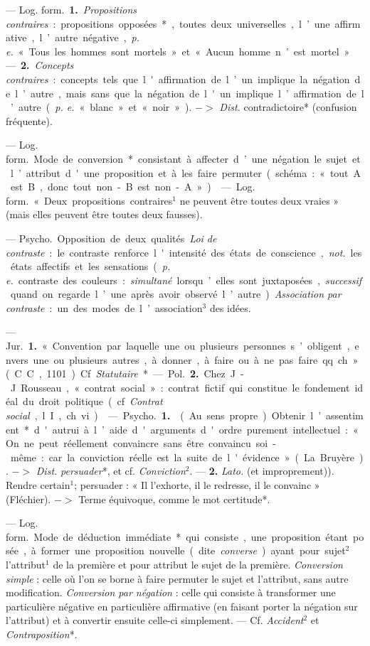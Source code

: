\begin{itemize}[leftmargin=1cm, label=, itemsep=11pt]
 — \si{Log. form.} {\bf 1.} {\it Propositions contraires} : propositions opposées*, toutes deux universelles, l’une
affirmative, l’autre négative, {\it p. e.}
« Tous les hommes sont mortels » et
« Aucun homme n’est mortel » —
 {\bf 2.} {\it Concepts contraires} : concepts tels
que l'affirmation de l’un implique
la négation de l’autre, mais sans que
la négation de l'un implique l’affirmation de l’autre ({\it p. e.} « blanc » et
« noir »). $->$ {\it Dist.} contradictoire*
(confusion fréquente).

 — \si{Log. form.} Mode
de conversion* consistant à affecter
d’une négation le sujet et l’attribut
d'une proposition et à les faire permuter (schéma : « tout A est B,
donc tout non-B est non-A »).

 — \si{Log. form.} « Deux propositions contraires$^1$
ne peuvent être toutes deux vraies »
(mais elles peuvent être toutes deux
fausses).

 — \si{Psycho.} Opposition de
deux qualités. {\it Loi de contraste} : le
contraste renforce l'intensité des
états de conscience, {\it not.} les états
affectifs et les sensations ({\it p. e.} contraste des couleurs : {\it simultané} lorsqu’elles sont juxtaposées, {\it successif}
quand on regarde l’une après avoir
observé l’autre). {\it Association par contraste} :
un des modes de l’association$^3$ des idées.

 — \si{Jur.} {\bf 1.} « Convention par
laquelle une ou plusieurs personnes
s’obligent, envers une ou plusieurs
autres, à donner, à faire ou à ne
pas faire qq. ch. » (C. C., 1101). Cf. {\it Statutaire}*.

— \si{Pol.} {\bf 2.} Chez J.-J. Rousseau,
«contrat social »: contrat fictif qui
constitue le fondement idéal du
droit politique (cf. {\it Contrat social},
l. I, ch. vi).

 — \si{Psycho.} {\bf 1.}  (Au sens
propre). Obtenir l’assentiment*
d'autrui à l’aide d'arguments d'ordre
purement intellectuel : « On ne peut
réellement convaincre sans être
convaincu soi-même: car la conviction réelle est la suite de l'évidence »
(La Bruyère). $->$ {\it Dist.} {\it persuader}*,
et cf. {\it Conviction}$^2$. — {\bf 2.} {\it Lato.} (et
improprement)).  Rendre certain$^1$;
persuader : « Il l’exhorte, il le redresse, il le convainc » (Fléchier).
$->$ Terme équivoque, comme le
mot certitude*.

 — \si{Log. form.} Mode de
déduction immédiate* qui consiste,
une proposition étant posée, à former une proposition nouvelle (dite
{\it converse}) ayant pour sujet$^2$ l'attribut$^1$ de la première et pour attribut le sujet de la première. {\it Conversion simple} : celle où l’on se borne à
faire permuter le sujet et l’attribut,
sans autre modification. {\it Conversion
par négation} : celle qui consiste à
transformer une particulière négative en particulière affirmative (en
faisant porter la négation sur l’attribut) et à convertir ensuite celle-ci
simplement. — Cf. {\it Accident}$^2$ et
{\it Contraposition}*.


\end{itemize}
